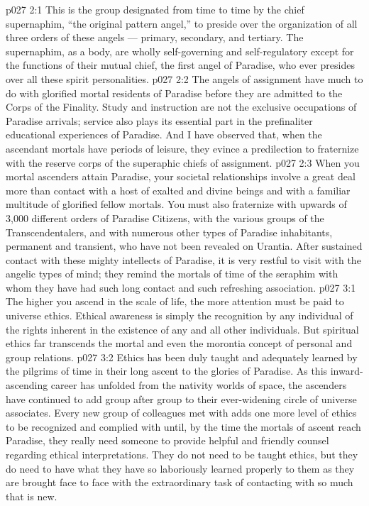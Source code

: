 \vs p027 2:1 This is the group designated from time to time by the chief supernaphim, “the original pattern angel,” to preside over the organization of all three orders of these angels --- primary, secondary, and tertiary. The supernaphim, as a body, are wholly self\hyp{}governing and self\hyp{}regulatory except for the functions of their mutual chief, the first angel of Paradise, who ever presides over all these spirit personalities.
\vs p027 2:2 The angels of assignment have much to do with glorified mortal residents of Paradise before they are admitted to the Corps of the Finality. Study and instruction are not the exclusive occupations of Paradise arrivals; service also plays its essential part in the prefinaliter educational experiences of Paradise. And I have observed that, when the ascendant mortals have periods of leisure, they evince a predilection to fraternize with the reserve corps of the superaphic chiefs of assignment.
\vs p027 2:3 When you mortal ascenders attain Paradise, your societal relationships involve a great deal more than contact with a host of exalted and divine beings and with a familiar multitude of glorified fellow mortals. You must also fraternize with upwards of 3,000 different orders of Paradise Citizens, with the various groups of the Transcendentalers, and with numerous other types of Paradise inhabitants, permanent and transient, who have not been revealed on Urantia. After sustained contact with these mighty intellects of Paradise, it is very restful to visit with the angelic types of mind; they remind the mortals of time of the seraphim with whom they have had such long contact and such refreshing association.
\vs p027 3:1 The higher you ascend in the scale of life, the more attention must be paid to universe ethics. Ethical awareness is simply the recognition by any individual of the rights inherent in the existence of any and all other individuals. But spiritual ethics far transcends the mortal and even the morontia concept of personal and group relations.
\vs p027 3:2 Ethics has been duly taught and adequately learned by the pilgrims of time in their long ascent to the glories of Paradise. As this inward\hyp{}ascending career has unfolded from the nativity worlds of space, the ascenders have continued to add group after group to their ever\hyp{}widening circle of universe associates. Every new group of colleagues met with adds one more level of ethics to be recognized and complied with until, by the time the mortals of ascent reach Paradise, they really need someone to provide helpful and friendly counsel regarding ethical interpretations. They do not need to be taught ethics, but they do need to have what they have so laboriously learned properly  to them as they are brought face to face with the extraordinary task of contacting with so much that is new.
